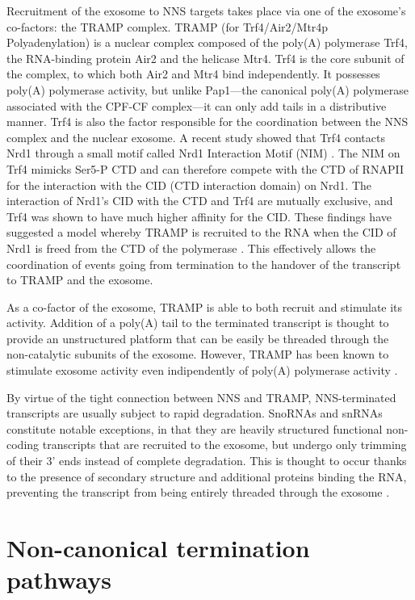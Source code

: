 Recruitment of the exosome to NNS targets takes place via one of the exosome’s co-factors: the TRAMP complex. 
TRAMP (for Trf4/Air2/Mtr4p Polyadenylation) is a nuclear complex composed of the poly(A) polymerase Trf4, the RNA-binding protein Air2 and the helicase Mtr4. 
Trf4 is the core subunit of the complex, to which both Air2 and Mtr4 bind independently. 
It possesses poly(A) polymerase activity, but unlike Pap1---the canonical poly(A) polymerase associated with the CPF-CF complex---it can only add tails in a distributive manner. 
Trf4 is also the factor responsible for the coordination between the NNS complex and the nuclear exosome. 
A recent study showed that Trf4 contacts Nrd1 through a small motif called Nrd1 Interaction Motif (NIM) . 
The NIM on Trf4 mimicks Ser5-P CTD and can therefore compete with the CTD of RNAPII for the interaction with the CID (CTD interaction domain) on Nrd1. 
The interaction of Nrd1’s CID with the CTD and Trf4 are mutually exclusive, and Trf4 was shown to have much higher affinity for the CID. 
These findings have suggested a model whereby TRAMP is recruited to the RNA when the CID of Nrd1 is freed from the CTD of the polymerase \cite{tudek:2014:molecular}. 
This effectively allows the coordination of events going from termination to the handover of the transcript to TRAMP and the exosome.

As a co-factor of the exosome, TRAMP is able to both recruit and stimulate its activity. 
Addition of a poly(A) tail to the terminated transcript is thought to provide an unstructured platform that can be easily be threaded through the non-catalytic subunits of the exosome. 
However, TRAMP has been known to stimulate exosome activity even indipendently of poly(A) polymerase activity \cite{tudek:2014:molecular}. 

By virtue of the tight connection between NNS and TRAMP, NNS-terminated transcripts are usually subject to rapid degradation. SnoRNAs and snRNAs constitute notable exceptions, in that they are heavily structured functional non-coding transcripts that are recruited to the exosome, but undergo only trimming of their 3’ ends instead of complete degradation. This is thought to occur thanks to the presence of secondary structure and additional proteins binding the RNA, preventing the transcript from being entirely threaded through the exosome \cite{mitchell:1997:exosome}.


\section{Non-canonical termination pathways}

